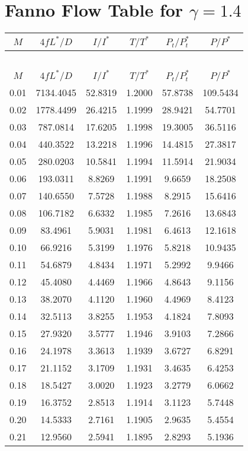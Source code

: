 \documentclass{article}
\begin{document}
\section*{Fanno Flow Table for $\gamma = 1.4$}
\begin{longtable}{cccccc}

\toprule
$M$ & $4f L^*/D$ & $I/I^*$ & $T/T^*$ & $P_t/P_t^*$ & $P/P^*$ \\
\midrule
\endfirsthead
\multicolumn{6}{c}{~} \\
\toprule
$M$ & $4f L^*/D$ & $I/I^*$ & $T/T^*$ & $P_t/P_t^*$ & $P/P^*$ \\
\midrule
\endhead
0.01 & 7134.4045 & 52.8319 & 1.2000 & 57.8738 & 109.5434 \\
0.02 & 1778.4499 & 26.4215 & 1.1999 & 28.9421 & 54.7701 \\
0.03 & 787.0814 & 17.6205 & 1.1998 & 19.3005 & 36.5116 \\
0.04 & 440.3522 & 13.2218 & 1.1996 & 14.4815 & 27.3817 \\
0.05 & 280.0203 & 10.5841 & 1.1994 & 11.5914 & 21.9034 \\
0.06 & 193.0311 & 8.8269 & 1.1991 & 9.6659 & 18.2508 \\
0.07 & 140.6550 & 7.5728 & 1.1988 & 8.2915 & 15.6416 \\
0.08 & 106.7182 & 6.6332 & 1.1985 & 7.2616 & 13.6843 \\
0.09 & 83.4961 & 5.9031 & 1.1981 & 6.4613 & 12.1618 \\
0.10 & 66.9216 & 5.3199 & 1.1976 & 5.8218 & 10.9435 \\
0.11 & 54.6879 & 4.8434 & 1.1971 & 5.2992 & 9.9466 \\
0.12 & 45.4080 & 4.4469 & 1.1966 & 4.8643 & 9.1156 \\
0.13 & 38.2070 & 4.1120 & 1.1960 & 4.4969 & 8.4123 \\
0.14 & 32.5113 & 3.8255 & 1.1953 & 4.1824 & 7.8093 \\
0.15 & 27.9320 & 3.5777 & 1.1946 & 3.9103 & 7.2866 \\
0.16 & 24.1978 & 3.3613 & 1.1939 & 3.6727 & 6.8291 \\
0.17 & 21.1152 & 3.1709 & 1.1931 & 3.4635 & 6.4253 \\
0.18 & 18.5427 & 3.0020 & 1.1923 & 3.2779 & 6.0662 \\
0.19 & 16.3752 & 2.8513 & 1.1914 & 3.1123 & 5.7448 \\
0.20 & 14.5333 & 2.7161 & 1.1905 & 2.9635 & 5.4554 \\
0.21 & 12.9560 & 2.5941 & 1.1895 & 2.8293 & 5.1936 \\

\end{longtable}
\end{document}
